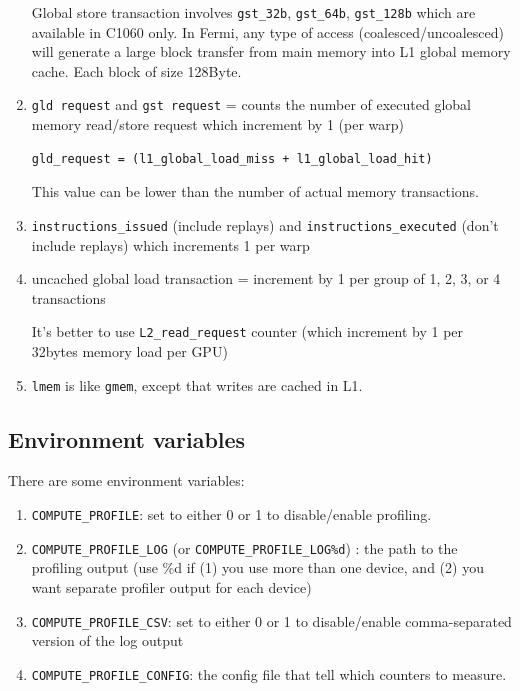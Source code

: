 \begin{enumerate}
  Global store transaction involves \verb!gst_32b!, \verb!gst_64b!,
  \verb!gst_128b! which are available in C1060 only. In Fermi, any
  type of access (coalesced/uncoalesced) will generate a large block
  transfer from main memory into L1 global memory cache. Each block of
  size 128Byte. 

\item \verb!gld request! and \verb!gst request! = counts the number
  of executed global memory read/store request which increment by 1
  (per warp)
  
\begin{verbatim}
gld_request = (l1_global_load_miss + l1_global_load_hit)
\end{verbatim}
  This value can be lower than the number of actual memory
  transactions.
  
\item \verb!instructions_issued! (include replays) and
  \verb!instructions_executed! (don't include replays) which
  increments 1 per warp

\item uncached global load transaction = increment by 1 per group of
  1, 2, 3, or 4 transactions
  
  It's better to use \verb!L2_read_request! counter (which increment
  by 1 per 32bytes memory load per GPU)

\item \verb!lmem! is like \verb!gmem!, except that writes are cached
  in L1. 
\end{enumerate}

\subsection{Environment variables}
\label{sec:envir-vari}

There are some environment variables:
\begin{enumerate}
\item \verb!COMPUTE_PROFILE!: set to either 0 or 1 to disable/enable
  profiling. 
\item \verb!COMPUTE_PROFILE_LOG! (or \verb!COMPUTE_PROFILE_LOG%d!) :
  the path to the profiling output (use \%d if (1) you use more than
  one device, and (2) you want separate profiler output for each
  device)
\item \verb!COMPUTE_PROFILE_CSV!: set to either 0 or 1 to
  disable/enable comma-separated version of the log output

\item \verb!COMPUTE_PROFILE_CONFIG!: the config file that tell which
  counters to measure. 
\end{enumerate}
